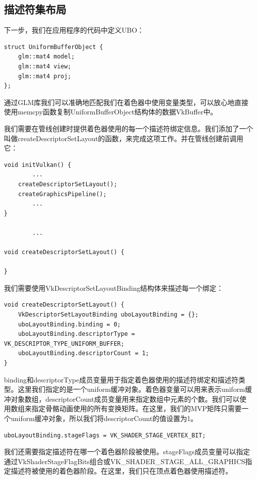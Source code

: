 \documentclass{ctexart}
\begin{document}
\subsection{描述符集布局}

下一步，我们在应用程序的代码中定义UBO：

\begin{lstlisting}[language={[ANSI]C}]
struct UniformBufferObject {
	glm::mat4 model;
	glm::mat4 view;
	glm::mat4 proj;
};
\end{lstlisting}

通过GLM库我们可以准确地匹配我们在着色器中使用变量类型，可以放心地直接使用memcpy函数复制UniformBufferObject结构体的数据VkBuffer中。

我们需要在管线创建时提供着色器使用的每一个描述符绑定信息。我们添加了一个叫做createDescriptorSetLayout的函数，来完成这项工作。并在管线创建前调用它：

\begin{lstlisting}[language={[ANSI]C}]
void initVulkan() {
		...
	createDescriptorSetLayout();
	createGraphicsPipeline();
		...
}

		...

void createDescriptorSetLayout() {

}
\end{lstlisting}

我们需要使用VkDescriptorSetLayoutBinding结构体来描述每一个绑定：

\begin{lstlisting}[language={[ANSI]C}]
void createDescriptorSetLayout() {
	VkDescriptorSetLayoutBinding uboLayoutBinding = {};
	uboLayoutBinding.binding = 0;
	uboLayoutBinding.descriptorType = VK_DESCRIPTOR_TYPE_UNIFORM_BUFFER;
	uboLayoutBinding.descriptorCount = 1;
}
\end{lstlisting}

binding和descriptorType成员变量用于指定着色器使用的描述符绑定和描述符类型。这里我们指定的是一个uniform缓冲对象。着色器变量可以用来表示uniform缓冲对象数组，descriptorCount成员变量用来指定数组中元素的个数。我们可以使用数组来指定骨骼动画使用的所有变换矩阵。在这里，我们的MVP矩阵只需要一个uniform缓冲对象，所以我们将descriptorCount的值设置为1。

\begin{lstlisting}[language={[ANSI]C}]
uboLayoutBinding.stageFlags = VK_SHADER_STAGE_VERTEX_BIT;
\end{lstlisting}

我们还需要指定描述符在哪一个着色器阶段被使用。stageFlags成员变量可以指定通过VkShaderStageFlagBits组合或VK\_SHADER\_STAGE\_ALL\_GRAPHICS指定描述符被使用的着色器阶段。在这里，我们只在顶点着色器使用描述符。
\end{document}
